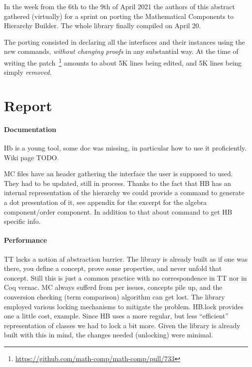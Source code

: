\documentclass{easychair}
\begin{document}
In the week from the 6th to the 9th of April 2021 the authors of this abstract
gathered (virtually) for a sprint on porting the Mathematical Components to
Hierarchy Builder. The whole library finally compiled on April 20.

The porting consisted in declaring all the interfaces and their instances
using the new commands, \emph{without changing proofs} in any substantial way.
At the time of writing the patch~\footnote{\url{https://github.com/math-comp/math-comp/pull/733}}
amounts to about 5K lines being edited, and 5K lines being simply \emph{removed}.

\section{Report}

\paragraph{Documentation}

Hb is a young tool, some doc was missing, in particular how to use it
proficiently. Wiki page TODO.

MC files have an header gathering the interface the user is supposed to used.
They had to be updated, still in process. Thanks to the fact that HB has an
internal representation of the hierarchy we could provide a command to
generate a dot presentation of it, see appendix for the excerpt for the
algebra component/order component. In addition to that about command to get HB
specific info.

\paragraph{Performance}

TT lacks a notion af abstraction barrier. The library is already built
as if one was there, you define a concept, prove some properties, and never
unfold that concept. Still this is just a common practice with no correspondence
in TT nor in Coq vernac. MC always sufferd from per issues, concepts pile up,
and the conversion checking (term comparison) algorithm can get lost. The
library employed various locking mechanisms to mitigate the problem. HB.lock
provides one a little cost, example.
Since HB uses a more regular, but less ``efficient'' representation of classes
we had to lock a bit more. Given the library is already built with this in mind,
the changes needed (unlocking) were minimal.
\end{document}
